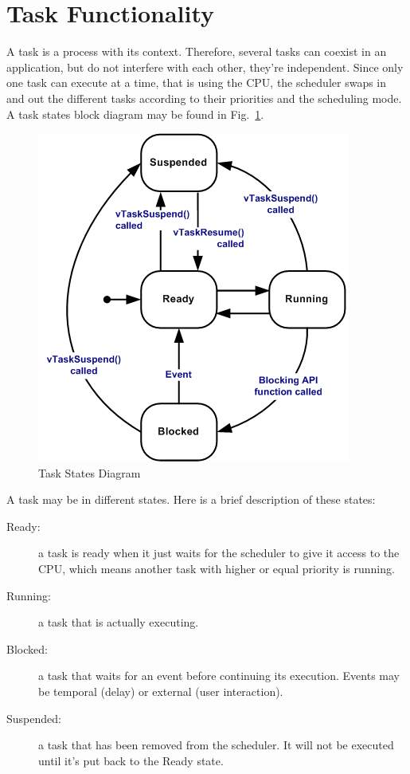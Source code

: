 \documentclass[11pt]{report}
\begin{document}
\section{Task Functionality}
A task is a process with its context. Therefore, several tasks can coexist in an application, but do not interfere with each other, they're independent. Since only one task can execute at a time, that is using the CPU, the scheduler swaps in and out the different tasks according to their priorities and the scheduling mode. A task states block diagram may be found in Fig.~\ref{task_diagram}.

\begin{figure}[ht]
\begin{center}
\includegraphics[scale=0.5]{figures/tskstate.png}
\end{center}
\caption{Task States Diagram}
\label{task_diagram}
\end{figure}

A task may be in different states. Here is a brief description of these states:
\begin{description}
	\item[Ready:] a task is ready when it just waits for the scheduler to give it access to the CPU, which means another task with higher or equal priority is running.
	\item[Running:] a task that is actually executing.
	\item[Blocked:] a task that waits for an event before continuing its execution. Events may be temporal (delay) or external (user interaction).
	\item[Suspended:] a task that has been removed from the scheduler. It will not be executed until it's put back to the Ready state.
\end{description}
\end{document}
